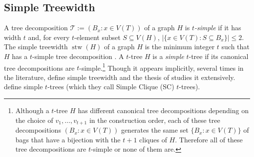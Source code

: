 \documentclass[kpfonts]{patmorin}
\DeclareMathOperator{\stw}{stw}
\theoremstyle{named}
\begin{document}
%

\subsection{Simple Treewidth}


A tree decomposition $\mathcal{T}:=(B_x:x\in V(T))$ of a graph $H$ is \emph{$t$-simple} if it has width $t$ and, for every $t$-element subset $S\subseteq V(H)$, $|\{x\in V(T):S\subseteq B_x\}|\le 2$.  The simple treewidth $\stw(H)$ of a graph $H$ is the minimum integer $t$ such that $H$ has a $t$-simple tree decomposition \cite{knauer.ueckerdt:simple}.  A $t$-tree $H$ is a \emph{simple} $t$-tree if its canonical tree decompositions are $t$-simple.\footnote{Although a $t$-tree $H$ has different canonical tree decompositions depending on the choice of $v_1,\ldots,v_{t+1}$ in the construction order, each of these tree decompositions $(B_x:x\in V(T))$ generates the same set $\{B_x:x\in V(T)\}$ of bags that have a bijection with the $t+1$ cliques of $H$.  Therefore all of these tree decompositions are $t$-simple or none of them are.}  Though it appears implicitly, several times in the literature, \citet{knauer.ueckerdt:simple} define simple treewidth and the thesis of \citet{wulf:stacked} studies it extensively. \citet{markenzon.justel.ea:subclasses} define simple $t$-trees (which they call Simple Clique (SC) $t$-trees).
\end{document}
